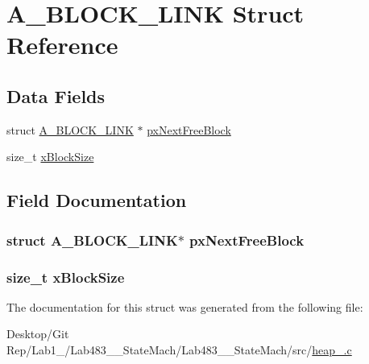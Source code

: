 \hypertarget{struct_a___b_l_o_c_k___l_i_n_k}{\section{A\-\_\-\-B\-L\-O\-C\-K\-\_\-\-L\-I\-N\-K Struct Reference}
\label{struct_a___b_l_o_c_k___l_i_n_k}
}
\subsection*{Data Fields}
\begin{DoxyCompactItemize}
\item 
struct \hyperlink{struct_a___b_l_o_c_k___l_i_n_k}{A\-\_\-\-B\-L\-O\-C\-K\-\_\-\-L\-I\-N\-K} $\ast$ \hyperlink{struct_a___b_l_o_c_k___l_i_n_k_ae48282896c5b0af5cb25f914f3c1c936}{px\-Next\-Free\-Block}
\item 
size\-\_\-t \hyperlink{struct_a___b_l_o_c_k___l_i_n_k_a130b4f85ad4cc46ca0f3d36001769696}{x\-Block\-Size}
\end{DoxyCompactItemize}


\subsection{Field Documentation}
\hypertarget{struct_a___b_l_o_c_k___l_i_n_k_ae48282896c5b0af5cb25f914f3c1c936}{
\subsubsection[{px\-Next\-Free\-Block}]{\setlength{\rightskip}{0pt plus 5cm}struct {\bf A\-\_\-\-B\-L\-O\-C\-K\-\_\-\-L\-I\-N\-K}$\ast$ px\-Next\-Free\-Block}}\label{struct_a___b_l_o_c_k___l_i_n_k_ae48282896c5b0af5cb25f914f3c1c936}
\hypertarget{struct_a___b_l_o_c_k___l_i_n_k_a130b4f85ad4cc46ca0f3d36001769696}{
\subsubsection[{x\-Block\-Size}]{\setlength{\rightskip}{0pt plus 5cm}size\-\_\-t x\-Block\-Size}}\label{struct_a___b_l_o_c_k___l_i_n_k_a130b4f85ad4cc46ca0f3d36001769696}


The documentation for this struct was generated from the following file\-:\begin{DoxyCompactItemize}
\item 
Desktop/\-Git Rep/\-Lab1\-\_/\-Lab483\-\_\-\_\-\-State\-Mach/\-Lab483\-\_\-\_\-\-State\-Mach/src/\hyperlink{heap__2_8c}{heap\-\_.\-c}\end{DoxyCompactItemize}
